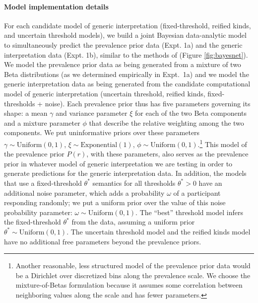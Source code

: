\documentclass[floatsintext,man]{apa6}
\let\oldparagraph\paragraph
\renewcommand{\paragraph}[1]{\oldparagraph{#1}\mbox{}}
\let\rmarkdownfootnote\footnote%
\def\footnote{\protect\rmarkdownfootnote}
\begin{document}
\paragraph{Model implementation details} 
For each candidate model of generic interpretation (fixed-threshold, reified kinds, and uncertain threshold models), we build a joint Bayesian data-analytic model to simultaneously predict the prevalence prior data (Expt. 1a) and the generic interpretation data (Expt. 1b), similar to the methods of  (Figure \ref{fig:bayesnet}).
We model the prevalence prior data as being generated from a mixture of two Beta distributions (as we determined empirically in Expt.~1a) and we model the generic interpretation data as being generated from the candidate computational model of generic interpretation (uncertain threshold, reified kinds, fixed-thresholds + noise).
Each prevalence prior thus has five parameters governing its shape: a mean \(\gamma\) and variance parameter \(\xi\) for each of the two Beta components and a mixture parameter $\phi$ that describe the relative weighting among the two components.
We put uninformative priors over these parameters \(\gamma \sim \text{Uniform}(0, 1)\), \(\xi \sim \text{Exponential}(1)\), \(\phi \sim \text{Uniform}(0,1)\).\footnote{Another reasonable, less structured model of the prevalence prior data would be a Dirichlet over discretized bins along the prevalence scale. We choose the mixture-of-Betas formulation because it assumes some correlation between neighboring values along the scale and has fewer parameters. }
This model of the prevalence prior \(P(r)\), with these parameters, also serves as the prevalence prior in whatever model of generic interpretation we are testing in order to generate predictions for the generic interpretation data. 
In addition, the models that use a fixed-threshold $\theta^*$ semantics for all thresholds $\theta^* > 0$ have an additional noise parameter, which adds a probability \(\omega\) of a participant responding randomly; we put a uniform prior over the value of this noise probability parameter: \(\omega \sim \text{Uniform}(0, 1)\).
The ``best'' threshold model infers the fixed-threshold $\theta^*$ from the data, assuming a uniform prior \(\theta^* \sim \text{Uniform}(0, 1)\).
The uncertain threshold model and the reified kinds model have no additional free parameters beyond the prevalence priors. 
\end{document}
